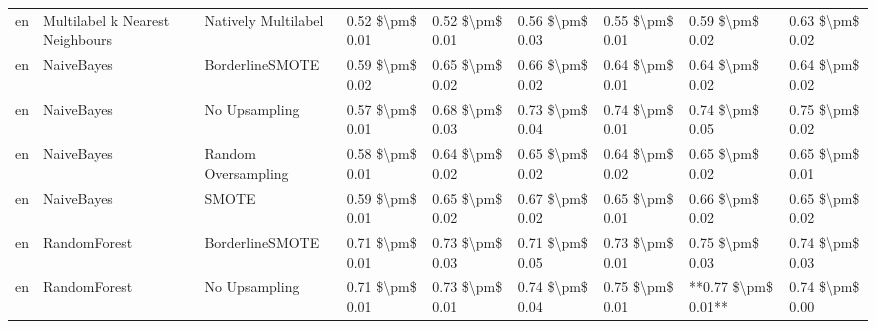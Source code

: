 \begin{tabular}{lllllllll}
      en & Multilabel k Nearest Neighbours &           Natively Multilabel & 0.52 \$\textbackslash pm\$ 0.01 &           0.52 \$\textbackslash pm\$ 0.01 &       0.56 \$\textbackslash pm\$ 0.03 &        0.55 \$\textbackslash pm\$ 0.01 &                         0.59 \$\textbackslash pm\$ 0.02 &     0.63 \$\textbackslash pm\$ 0.02 \\
      en &                      NaiveBayes &               BorderlineSMOTE & 0.59 \$\textbackslash pm\$ 0.02 &           0.65 \$\textbackslash pm\$ 0.02 &       0.66 \$\textbackslash pm\$ 0.02 &        0.64 \$\textbackslash pm\$ 0.01 &                         0.64 \$\textbackslash pm\$ 0.02 &     0.64 \$\textbackslash pm\$ 0.02 \\
      en &                      NaiveBayes &                 No Upsampling & 0.57 \$\textbackslash pm\$ 0.01 &           0.68 \$\textbackslash pm\$ 0.03 &       0.73 \$\textbackslash pm\$ 0.04 &        0.74 \$\textbackslash pm\$ 0.01 &                         0.74 \$\textbackslash pm\$ 0.05 &     0.75 \$\textbackslash pm\$ 0.02 \\
      en &                      NaiveBayes &           Random Oversampling & 0.58 \$\textbackslash pm\$ 0.01 &           0.64 \$\textbackslash pm\$ 0.02 &       0.65 \$\textbackslash pm\$ 0.02 &        0.64 \$\textbackslash pm\$ 0.02 &                         0.65 \$\textbackslash pm\$ 0.02 &     0.65 \$\textbackslash pm\$ 0.01 \\
      en &                      NaiveBayes &                         SMOTE & 0.59 \$\textbackslash pm\$ 0.01 &           0.65 \$\textbackslash pm\$ 0.02 &       0.67 \$\textbackslash pm\$ 0.02 &        0.65 \$\textbackslash pm\$ 0.01 &                         0.66 \$\textbackslash pm\$ 0.02 &     0.65 \$\textbackslash pm\$ 0.02 \\
      en &                    RandomForest &               BorderlineSMOTE & 0.71 \$\textbackslash pm\$ 0.01 &           0.73 \$\textbackslash pm\$ 0.03 &       0.71 \$\textbackslash pm\$ 0.05 &        0.73 \$\textbackslash pm\$ 0.01 &                         0.75 \$\textbackslash pm\$ 0.03 &     0.74 \$\textbackslash pm\$ 0.03 \\
      en &                    RandomForest &                 No Upsampling & 0.71 \$\textbackslash pm\$ 0.01 &           0.73 \$\textbackslash pm\$ 0.01 &       0.74 \$\textbackslash pm\$ 0.04 &        0.75 \$\textbackslash pm\$ 0.01 &                     **0.77 \$\textbackslash pm\$ 0.01** &     0.74 \$\textbackslash pm\$ 0.00 \\

\end{tabular}
